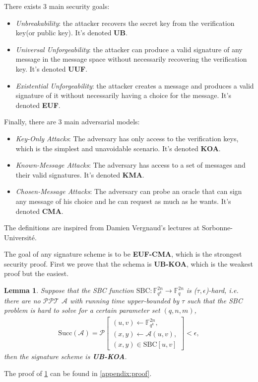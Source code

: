 \documentclass[english]{article}
\newtheorem{lemma}{Lemma}[section]
\begin{document}
		There exists 3 main security goals:
		\begin{itemize}
			\item \textit{Unbreakability}: the attacker recovers the secret key from the verification key(or public key). It's denoted \textbf{UB}.
			\item \textit{Universal Unforgeability}: the attacker can produce a valid signature of any message in the message space without necessarily recovering the verification key. It's denoted \textbf{UUF}.
			\item \textit{Existential Unforgeability}: the attacker creates a message and produces a valid signature of it without necessarily having a choice for the message.
			It's denoted \textbf{EUF}.
		\end{itemize}
		Finally, there are 3 main adversarial models:
		\begin{itemize}
			\item \textit{Key-Only Attacks}: The adversary has only access to the verification keys, which is the simplest and unavoidable scenario. It's denoted \textbf{KOA}.
			\item \textit{Known-Message Attacks}: The adversary has access to a set of messages and their valid signatures. It's denoted \textbf{KMA}. 
			\item \textit{Chosen-Message Attacks}: The adversary can probe an oracle that can sign any message of his choice and he can request as much as he wants. It's denoted \textbf{CMA}.
		\end{itemize}
		The definitions are inspired from Damien Vergnaud's lectures at Sorbonne-Université.
		
		The goal of any signature scheme is to be \textbf{EUF-CMA}, which is the strongest security proof. First we prove that the schema is \textbf{UB-KOA}, which is the weakest proof but the easiest.
		
		\begin{lemma}\label{UB-KOA}
			Suppose that the SBC function $\text{SBC}: \mathbb{F}_{q^k}^{2n} \rightarrow \mathbb{F}_{q}^{2n}$ is ($\tau, \epsilon$)-hard, i.e. there are no $\mathcal{PPT}$ $\mathcal{A}$ with running time upper-bounded by $\tau$ such that the SBC problem is hard to solve for a certain parameter set $(q, n, m)$,
			\begin{align*}
				\text{Succ}(\mathcal{A}) = \mathcal{P}\left[
				\begin{array}{l}
					(u, v) \leftarrow \mathbb{F}_{q^k}^{2n}, \\
					(x, y) \leftarrow \mathcal{A}(u, v), \\
					(x, y) \in \text{SBC}[u, v]
				\end{array}
				\right] < \epsilon,
			\end{align*}
			then the signature scheme is \textbf{UB-KOA}.
		\end{lemma}
		The proof of \ref{UB-KOA} can be found in \ref{appendix:proof}.
		
\end{document}
